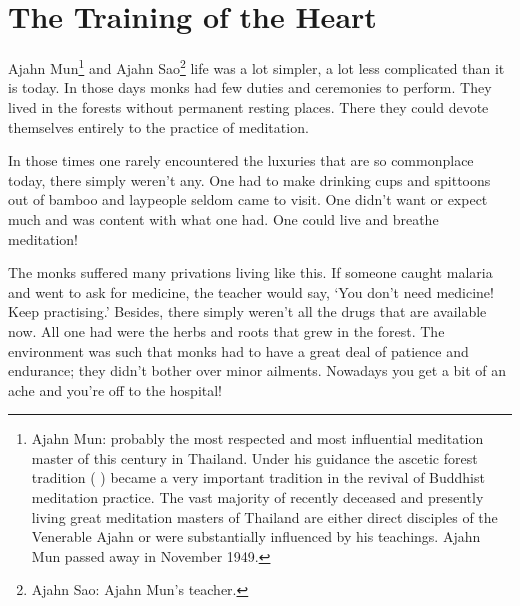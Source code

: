 
\chapter{The Training of the Heart}

 Ajahn Mun\footnote{Ajahn Mun: probably the most respected and most influential meditation master of this century in Thailand. Under his guidance the ascetic forest tradition ( ) became a very important tradition in the revival of Buddhist meditation practice. The vast majority of recently deceased and presently living great meditation masters of Thailand are either direct disciples of the Venerable Ajahn or were substantially influenced by his teachings. Ajahn Mun passed away in November 1949.} and Ajahn Sao\footnote{Ajahn Sao: Ajahn Mun's teacher.} life was a lot simpler, a lot less complicated than it is today. In those days monks had few duties and ceremonies to perform. They lived in the forests without permanent resting places. There they could devote themselves entirely to the practice of meditation. 

In those times one rarely encountered the luxuries that are so commonplace today, there simply weren't any. One had to make drinking cups and spittoons out of bamboo and laypeople seldom came to visit. One didn't want or expect much and was content with what one had. One could live and breathe meditation! 

The monks suffered many privations living like this. If someone caught malaria and went to ask for medicine, the teacher would say, `You don't need medicine! Keep practising.' Besides, there simply weren't all the drugs that are available now. All one had were the herbs and roots that grew in the forest. The environment was such that monks had to have a great deal of patience and endurance; they didn't bother over minor ailments. Nowadays you get a bit of an ache and you're off to the hospital! 

